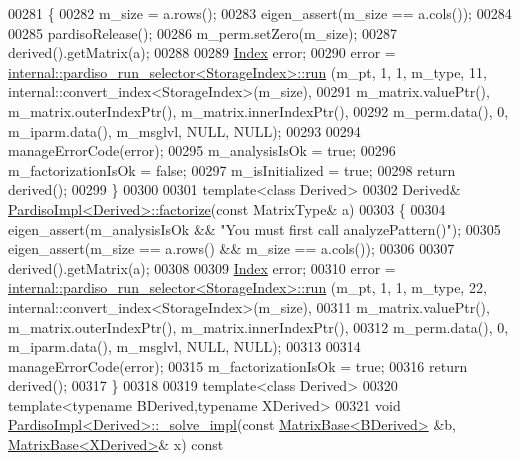 \begin{DoxyCode}
00281 \{
00282   m\_size = a.rows();
00283   eigen\_assert(m\_size == a.cols());
00284 
00285   pardisoRelease();
00286   m\_perm.setZero(m\_size);
00287   derived().getMatrix(a);
00288   
00289   \hyperlink{namespace_eigen_a62e77e0933482dafde8fe197d9a2cfde}{Index} error;
00290   error = \hyperlink{struct_eigen_1_1internal_1_1pardiso__run__selector}{internal::pardiso\_run\_selector<StorageIndex>::run}
      (m\_pt, 1, 1, m\_type, 11, internal::convert\_index<StorageIndex>(m\_size),
00291                                                             m\_matrix.valuePtr(), m\_matrix.outerIndexPtr(), 
      m\_matrix.innerIndexPtr(),
00292                                                             m\_perm.data(), 0, m\_iparm.data(), m\_msglvl, 
      NULL, NULL);
00293   
00294   manageErrorCode(error);
00295   m\_analysisIsOk = \textcolor{keyword}{true};
00296   m\_factorizationIsOk = \textcolor{keyword}{false};
00297   m\_isInitialized = \textcolor{keyword}{true};
00298   \textcolor{keywordflow}{return} derived();
00299 \}
00300 
00301 \textcolor{keyword}{template}<\textcolor{keyword}{class} Derived>
00302 Derived& \hyperlink{class_eigen_1_1_pardiso_impl_a6a4c092c5fb581a946d3c4e5ec347dfb}{PardisoImpl<Derived>::factorize}(\textcolor{keyword}{const} MatrixType& a)
00303 \{
00304   eigen\_assert(m\_analysisIsOk && \textcolor{stringliteral}{"You must first call analyzePattern()"});
00305   eigen\_assert(m\_size == a.rows() && m\_size == a.cols());
00306   
00307   derived().getMatrix(a);
00308 
00309   \hyperlink{namespace_eigen_a62e77e0933482dafde8fe197d9a2cfde}{Index} error;
00310   error = \hyperlink{struct_eigen_1_1internal_1_1pardiso__run__selector}{internal::pardiso\_run\_selector<StorageIndex>::run}
      (m\_pt, 1, 1, m\_type, 22, internal::convert\_index<StorageIndex>(m\_size),
00311                                                             m\_matrix.valuePtr(), m\_matrix.outerIndexPtr(), 
      m\_matrix.innerIndexPtr(),
00312                                                             m\_perm.data(), 0, m\_iparm.data(), m\_msglvl, 
      NULL, NULL);
00313   
00314   manageErrorCode(error);
00315   m\_factorizationIsOk = \textcolor{keyword}{true};
00316   \textcolor{keywordflow}{return} derived();
00317 \}
00318 
00319 \textcolor{keyword}{template}<\textcolor{keyword}{class} Derived>
00320 \textcolor{keyword}{template}<\textcolor{keyword}{typename} BDerived,\textcolor{keyword}{typename} XDerived>
00321 \textcolor{keywordtype}{void} \hyperlink{class_eigen_1_1_pardiso_impl}{PardisoImpl<Derived>::\_solve\_impl}(\textcolor{keyword}{const} 
      \hyperlink{group___core___module_class_eigen_1_1_matrix_base}{MatrixBase<BDerived>} &b, \hyperlink{group___core___module_class_eigen_1_1_matrix_base}{MatrixBase<XDerived>}& x)\textcolor{keyword}{ const}

\end{DoxyCode}
